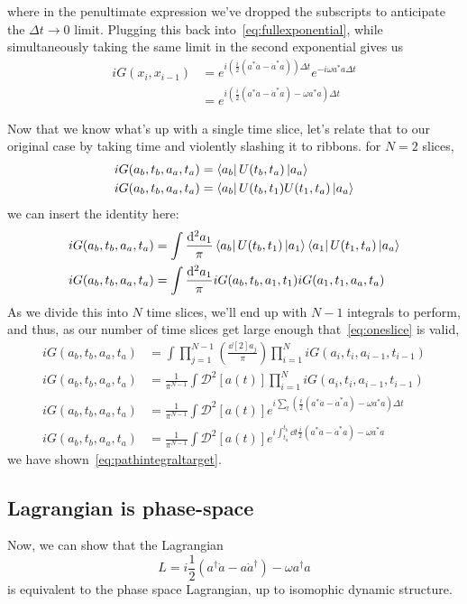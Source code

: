 \documentclass{article}
\newcommand{\msr}{\mathcal{D}}
\begin{document}
	where in the penultimate expression we've dropped the subscripts to anticipate the $\Delta t \rightarrow 0$ limit.
	Plugging this back into~\eqref{eq:fullexponential}, while simultaneously taking the same limit in the second exponential gives us
	\begin{align}
		i G(x_i, x_{i-1}) &= e^{i \left( \frac{i}{2} \left( a^\ast \dot{a} -  \dot{a}^\ast  a \right) \right) \Delta t}  e^{-i \omega a^\ast a \Delta t} \\
		&= e^{i \left( \frac{i}{2} \left( a^\ast \dot{a} -  \dot{a}^\ast  a \right) - \omega a^\ast a \right) \Delta t} \label{eq:oneslice}
	\end{align}

	Now that we know what's up with a single time slice, let's relate that to our original case by taking time and violently slashing it to ribbons.
	\triv for $N = 2$ slices,
	\begin{align}
		i G(a_b, t_b, a_a, t_a) &= \bra{a_b} U(t_b, t_a) \ket{a_a} \\
		i G(a_b, t_b, a_a, t_a) &= \bra{a_b} U(t_b, t_1) U(t_1, t_a) \ket{a_a}
	\end{align}
	\triv we can insert the identity here:
	\begin{align}
		i G(a_b, t_b, a_a, t_a) &= \int \frac{\dd[2]{a_1}}{\pi} \bra{a_b} U(t_b, t_1) \ket{a_1} \bra{a_1} U(t_1, t_a) \ket{a_a} \\
		i G(a_b, t_b, a_a, t_a) &= \int \frac{\dd[2]{a_1}}{\pi} i G(a_b, t_b, a_1, t_1)  i G(a_1, t_1, a_a, t_a)
	\end{align}
	As we divide this into $N$ time slices, we'll end up with $N - 1$ integrals to perform, and thus, as our number of time slices get large enough that~\eqref{eq:oneslice} is valid,
	\begin{align}
		i G(a_b, t_b, a_a, t_a) &= \int \prod_{j = 1}^{N - 1} \left( \frac{\dd[2]{a_j}}{\pi}\right)  \prod_{i=1}^{N} i G(a_i, t_i, a_{i-1}, t_{i-1}) \\
		i G(a_b, t_b, a_a, t_a) &= \frac{1}{\pi^{N - 1}} \int \msr^2[a(t)] \prod_{i=1}^{N} i G(a_i, t_i, a_{i-1}, t_{i-1}) \\
		i G(a_b, t_b, a_a, t_a) &= \frac{1}{\pi^{N - 1}} \int \msr^2[a(t)] e^{i \sum_t \left( \frac{i}{2} \left( a^\ast \dot{a} -  \dot{a}^\ast  a \right) - \omega a^\ast a \right) \Delta t} \\
		i G(a_b, t_b, a_a, t_a) &= \frac{1}{\pi^{N - 1}} \int \msr^2[a(t)] e^{i \int_{t_a}^{t_b} \dd{t} \frac{i}{2} \left( a^\ast \dot{a} -  \dot{a}^\ast  a \right) - \omega a^\ast a}
	\end{align}
	\thrf we have shown~\eqref{eq:pathintegraltarget}.
	\subsection{Lagrangian is phase-space} \label{subsec:lagrangianphasespace}
	Now, we can show that the Lagrangian
	\begin{equation}
		L = i\frac12 \left(a^\dagger \dot{a} - a \dot{a}^\dagger \right) - \omega a^\dagger a
	\end{equation}
	is equivalent to the phase space Lagrangian, up to isomophic dynamic structure.


	\newpage
	\listoftodos
\end{document}

